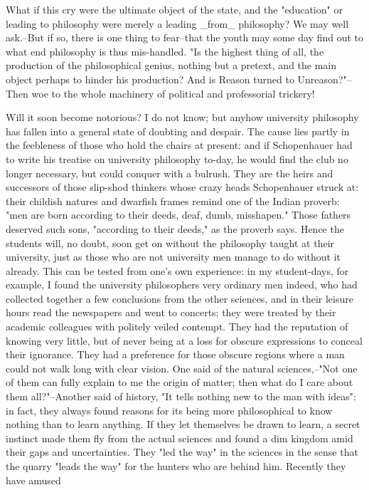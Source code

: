 What if this cry were the ultimate object of the state, and the
"education" or leading to philosophy were merely a leading _from_
philosophy? We may well ask.--But if so, there is one thing to
fear--that the youth may some day find out to what end philosophy is
thus mis-handled. "Is the highest thing of all, the production of the
philosophical genius, nothing but a pretext, and the main object
perhaps to hinder his production? And is Reason turned to
Unreason?"--Then woe to the whole machinery of political and
professorial trickery!

Will it soon become notorious? I do not know; but anyhow university
philosophy has fallen into a general state of doubting and despair.
The cause lies partly in the feebleness of those who hold the chairs
at present: and if Schopenhauer had to write his treatise on
university philosophy to-day, he would find the club no longer
necessary, but could conquer with a bulrush. They are the heirs and
successors of those slip-shod thinkers whose crazy heads Schopenhauer
struck at: their childish natures and dwarfish frames remind one of
the Indian proverb: "men are born according to their deeds, deaf,
dumb, misshapen." Those fathers deserved such sons, "according to
their deeds," as the proverb says. Hence the students will, no doubt,
soon get on without the philosophy taught at their university, just
as those who are not university men manage to do without it already.
This can be tested from one's own experience: in my student-days, for
example, I found the university philosophers very ordinary men
indeed, who had collected together a few conclusions from the other
sciences, and in their leisure hours read the newspapers and went to
concerts; they were treated by their academic colleagues with
politely veiled contempt. They had the reputation of knowing very
little, but of never being at a loss for obscure expressions to
conceal their ignorance. They had a preference for those obscure
regions where a man could not walk long with clear vision. One said
of the natural sciences,--"Not one of them can fully explain to me
the origin of matter; then what do I care about them all?"--Another
said of history, "It tells nothing new to the man with ideas": in
fact, they always found reasons for its being more philosophical to
know nothing than to learn anything. If they let themselves be drawn
to learn, a secret instinct made them fly from the actual sciences
and found a dim kingdom amid their gaps and uncertainties. They "led
the way" in the sciences in the sense that the quarry "leads the way"
for the hunters who are behind him. Recently they have amused
